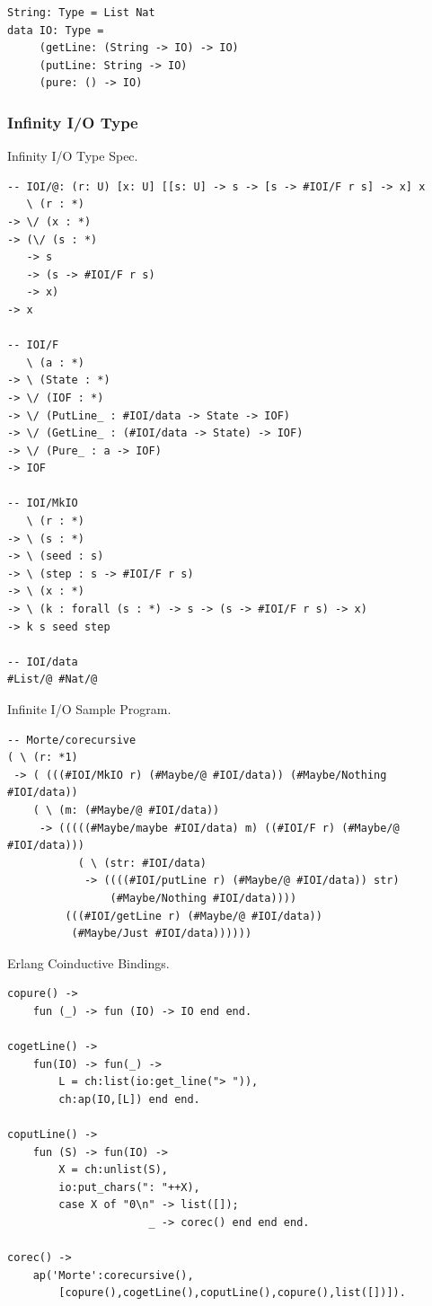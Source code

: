 \documentclass{aip-cp}
\begin{document}
\begin{lstlisting}
String: Type = List Nat
data IO: Type =
     (getLine: (String -> IO) -> IO)
     (putLine: String -> IO)
     (pure: () -> IO)
\end{lstlisting}

\subsubsection{Infinity I/O Type}

Infinity I/O Type Spec.

\begin{lstlisting}[mathescape=true]
-- IOI/@: (r: U) [x: U] [[s: U] -> s -> [s -> #IOI/F r s] -> x] x
   \ (r : *)
-> \/ (x : *)
-> (\/ (s : *)
   -> s
   -> (s -> #IOI/F r s)
   -> x)
-> x

-- IOI/F
   \ (a : *)
-> \ (State : *)
-> \/ (IOF : *)
-> \/ (PutLine_ : #IOI/data -> State -> IOF)
-> \/ (GetLine_ : (#IOI/data -> State) -> IOF)
-> \/ (Pure_ : a -> IOF)
-> IOF

-- IOI/MkIO
   \ (r : *)
-> \ (s : *)
-> \ (seed : s)
-> \ (step : s -> #IOI/F r s)
-> \ (x : *)
-> \ (k : forall (s : *) -> s -> (s -> #IOI/F r s) -> x)
-> k s seed step

-- IOI/data
#List/@ #Nat/@
\end{lstlisting}

Infinite I/O Sample Program.

\begin{lstlisting}[mathescape=true]
-- Morte/corecursive
( \ (r: *1)
 -> ( (((#IOI/MkIO r) (#Maybe/@ #IOI/data)) (#Maybe/Nothing #IOI/data))
    ( \ (m: (#Maybe/@ #IOI/data))
     -> (((((#Maybe/maybe #IOI/data) m) ((#IOI/F r) (#Maybe/@ #IOI/data)))
           ( \ (str: #IOI/data)
            -> ((((#IOI/putLine r) (#Maybe/@ #IOI/data)) str)
                (#Maybe/Nothing #IOI/data))))
         (((#IOI/getLine r) (#Maybe/@ #IOI/data))
          (#Maybe/Just #IOI/data))))))
\end{lstlisting}

Erlang Coinductive Bindings.

\begin{lstlisting}[mathescape=true]
copure() ->
    fun (_) -> fun (IO) -> IO end end.

cogetLine() ->
    fun(IO) -> fun(_) ->
        L = ch:list(io:get_line("> ")),
        ch:ap(IO,[L]) end end.

coputLine() ->
    fun (S) -> fun(IO) ->
        X = ch:unlist(S),
        io:put_chars(": "++X),
        case X of "0\n" -> list([]);
                      _ -> corec() end end end.

corec() ->
    ap('Morte':corecursive(),
        [copure(),cogetLine(),coputLine(),copure(),list([])]).
\end{lstlisting}
\end{document}
